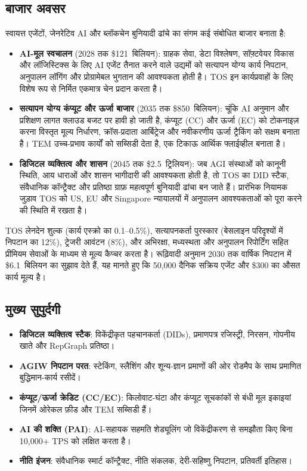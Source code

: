 \documentclass[11pt]{article}
\begin{document}
\subsection{बाजार अवसर}
स्वायत्त एजेंटों, जेनरेटिव AI और ब्लॉकचेन बुनियादी ढांचे का संगम कई संबोधित बाजार बनाता है:
\begin{itemize}[noitemsep]
  \item \textbf{AI-मूल स्वचालन} (2028 तक \$121~बिलियन): ग्राहक सेवा, डेटा विश्लेषण, सॉफ़्टवेयर विकास और लॉजिस्टिक्स के लिए AI एजेंट तैनात करने वाले उद्यमों को सत्यापन योग्य कार्य निपटान, अनुपालन लॉगिंग और प्रोग्रामेबल भुगतान की आवश्यकता होती है। TOS इन कार्यप्रवाहों के लिए विशेष रूप से निर्मित एकमात्र चेन प्रदान करता है।
  \item \textbf{सत्यापन योग्य कंप्यूट और ऊर्जा बाजार} (2035 तक \$850~बिलियन): चूंकि AI अनुमान और प्रशिक्षण लागत क्लाउड बजट पर हावी हो जाती है, कंप्यूट (CC) और ऊर्जा (EC) को टोकनाइज़ करना विस्तृत मूल्य निर्धारण, क्रॉस-प्रदाता आर्बिट्रेज और नवीकरणीय ऊर्जा ट्रैकिंग को सक्षम बनाता है। TEM उच्च-प्रभाव कार्यों को सब्सिडी देता है, एक टिकाऊ आर्थिक फ्लाईव्हील बनाता है।
  \item \textbf{डिजिटल व्यक्तित्व और शासन} (2045 तक \$2.5~ट्रिलियन): जब AGI संस्थाओं को कानूनी स्थिति, आय धाराओं और शासन भागीदारी की आवश्यकता होती है, तो TOS का DID स्टैक, संवैधानिक कॉन्ट्रैक्ट और प्रतिष्ठा ग्राफ़ महत्वपूर्ण बुनियादी ढांचा बन जाते हैं। प्रारंभिक नियामक जुड़ाव TOS को US, EU और Singapore न्यायालयों में अनुपालन आवश्यकताओं को पूरा करने की स्थिति में रखता है।
\end{itemize}

TOS लेनदेन शुल्क (कार्य एस्क्रो का 0.1--0.5\%), सत्यापनकर्ता पुरस्कार (बेसलाइन परिदृश्यों में निपटान का 12\%), ट्रेजरी आवंटन (8\%), और अभिरक्षा, मध्यस्थता और अनुपालन रिपोर्टिंग सहित प्रीमियम सेवाओं के माध्यम से मूल्य कैप्चर करता है। रूढ़िवादी अनुमान 2030 तक वार्षिक निपटान में \$6.1~बिलियन का सुझाव देते हैं, यह मानते हुए कि 50,000 दैनिक सक्रिय एजेंट और \$300 का औसत कार्य मूल्य है।

\subsection{मुख्य सुपुर्दगी}
\begin{itemize}[noitemsep]
  \item \textbf{डिजिटल व्यक्तित्व स्टैक}: विकेंद्रीकृत पहचानकर्ता (DIDs), प्रमाणपत्र रजिस्ट्री, निरसन, गोपनीय खाते और RepGraph प्रतिष्ठा।
  \item \textbf{AGIW निपटान परत}: स्टेकिंग, स्लैशिंग और शून्य-ज्ञान प्रमाणों की ओर रोडमैप के साथ प्रमाणित बुद्धिमान-कार्य रसीदें।
  \item \textbf{कंप्यूट/ऊर्जा क्रेडिट (CC/EC)}: किलोवाट-घंटा और कंप्यूट सूचकांकों से बंधी मूल इकाइयां जिनमें ओरेकल फ़ीड और TEM सब्सिडी हैं।
  \item \textbf{AI की शक्ति (PAI)}: AI-सहायक सहमति शेड्यूलिंग जो विकेंद्रीकरण से समझौता किए बिना 10,000+ TPS को लक्षित करता है।
  \item \textbf{नीति इंजन}: संवैधानिक स्मार्ट कॉन्ट्रैक्ट, नीति संकलक, देरी-सहिष्णु निपटान, प्रतिवर्ती इतिहास।
\end{itemize}
\end{document}

